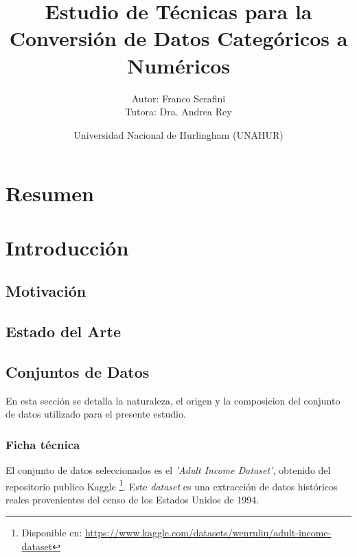 \documentclass[a4paper,10pt]{book}
\title{Estudio de Técnicas para la Conversión de Datos Categóricos a Numéricos}
\author{Autor: Franco Serafini  \\ Tutora: Dra. Andrea Rey}
\date{Universidad Nacional de Hurlingham (UNAHUR)}
\renewcommand{\listfigurename}{\'Indice de Figuras}
\renewcommand{\listtablename}{\'Indice de Tablas}
\begin{document}
\maketitle


	\tableofcontents
	
	\renewcommand{\listfigurename}{Índice de Figuras}
	\listoffigures
	
    \renewcommand{\listtablename}{Índice de Tablas}
	\listoftables



\chapter*{Resumen}

\noindent



\chapter{Introducción}



\section{Motivación}

\section{Estado del Arte}
 
\section{Conjuntos de Datos}
	
	En esta sección se detalla la naturaleza, el origen y la composicion del conjunto de datos utilizado para el presente estudio.
	
	\subsection{Ficha técnica}
		
			El conjunto de datos seleccionados es el \textit{'Adult Income Dataset'}, obtenido del repositorio publico Kaggle \footnote{Disponible en: \url{https://www.kaggle.com/datasets/wenruliu/adult-income-dataset}}. Este \textit{dataset} es una extracción de datos históricos reales provenientes del censo de los Estados Unidos de 1994.
			
\end{document}
